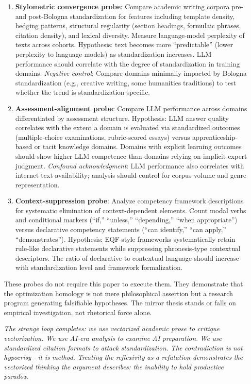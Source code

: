 \begin{enumerate}
\item \textbf{Stylometric convergence probe}: Compare academic writing corpora pre- and post-Bologna standardization for features including template density, hedging patterns, structural regularity (section headings, formulaic phrases, citation density), and lexical diversity. Measure language-model perplexity of texts across cohorts. Hypothesis: text becomes more ``predictable'' (lower perplexity to language models) as standardization increases. LLM performance should correlate with the degree of standardization in training domains. \textit{Negative control}: Compare domains minimally impacted by Bologna standardization (e.g., creative writing, some humanities traditions) to test whether the trend is standardization-specific.

\item \textbf{Assessment-alignment probe}: Compare LLM performance across domains differentiated by assessment structure. Hypothesis: LLM answer quality correlates with the extent a domain is evaluated via standardized outcomes (multiple-choice examinations, rubric-scored essays) versus apprenticeship-based or tacit knowledge domains. Domains with explicit learning outcomes should show higher LLM competence than domains relying on implicit expert judgment. \textit{Confound acknowledgment}: LLM performance also correlates with internet text availability; analysis should control for corpus volume and genre representation.

\item \textbf{Context-suppression probe}: Analyze competency framework descriptions for systematic elimination of context-dependent elements. Count modal verbs and conditional markers (``if,'' ``unless,'' ``depending,'' ``when appropriate'') versus declarative competency statements (``can identify,'' ``can apply,'' ``demonstrates''). Hypothesis: EQF-style frameworks systematically retain rule-like declarative statements while suppressing phronesis-type contextual descriptors. The ratio of declarative to contextual language should increase with standardization level and framework formalization.
\end{enumerate}

These probes do not require this paper to execute them. They demonstrate that the optimization homology is not mere philosophical assertion but a research program generating falsifiable hypotheses. The mirror thesis stands or falls on empirical investigation, not rhetorical force alone.

\bigskip
\noindent\textit{The strange loop completes: we use vectorized academic prose to critique vectorization. We use AI-era analysis to examine AI preparation. We use standardized citation formats to attack standardization. The contradiction is not hypocrisy---it is method. Treating the reflexivity as a refutation demonstrates the vectorized thinking the argument describes: the inability to hold productive paradox.}

